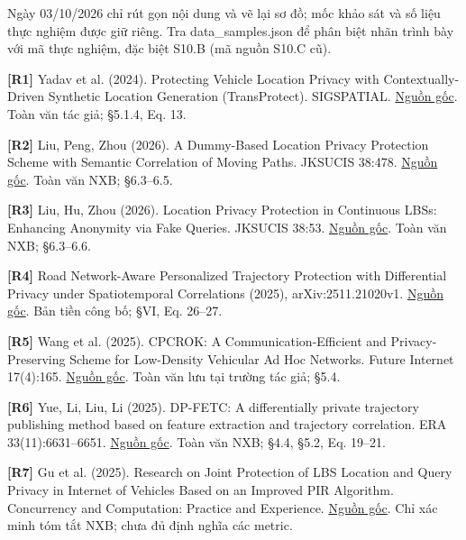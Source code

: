 \documentclass[10pt,a4paper]{article}
\begin{document}
Ngày 03/10/2026 chỉ rút gọn nội dung và vẽ lại sơ đồ; mốc khảo sát và số liệu thực nghiệm được giữ riêng. Tra data\_\allowbreak{}samples.json để phân biệt nhãn trình bày với mã thực nghiệm, đặc biệt S10.B (mã nguồn S10.C cũ).

\par\hypertarget{ref-R1}{}\textbf{[R1]} Yadav et al. (2024). Protecting Vehicle Location Privacy with Contextually-Driven Synthetic Location Generation (TransProtect). SIGSPATIAL. \href{https://arxiv.org/html/2409.09495v1}{Nguồn gốc}. Toàn văn tác giả; §5.1.4, Eq. 13.
\par\hypertarget{ref-R2}{}\textbf{[R2]} Liu, Peng, Zhou (2026). A Dummy-Based Location Privacy Protection Scheme with Semantic Correlation of Moving Paths. JKSUCIS 38:478. \href{https://link.springer.com/article/10.1007/s44443-026-00899-w}{Nguồn gốc}. Toàn văn NXB; §6.3–6.5.
\par\hypertarget{ref-R3}{}\textbf{[R3]} Liu, Hu, Zhou (2026). Location Privacy Protection in Continuous LBSs: Enhancing Anonymity via Fake Queries. JKSUCIS 38:53. \href{https://link.springer.com/article/10.1007/s44443-025-00438-z}{Nguồn gốc}. Toàn văn NXB; §6.3–6.6.
\par\hypertarget{ref-R4}{}\textbf{[R4]} Road Network-Aware Personalized Trajectory Protection with Differential Privacy under Spatiotemporal Correlations (2025), arXiv:2511.21020v1. \href{https://arxiv.org/html/2511.21020v1}{Nguồn gốc}. Bản tiền công bố; §VI, Eq. 26–27.
\par\hypertarget{ref-R5}{}\textbf{[R5]} Wang et al. (2025). CPCROK: A Communication-Efficient and Privacy-Preserving Scheme for Low-Density Vehicular Ad Hoc Networks. Future Internet 17(4):165. \href{https://uhra.herts.ac.uk/id/eprint/25705/1/futureinternet-17-00165.pdf}{Nguồn gốc}. Toàn văn lưu tại trường tác giả; §5.4.
\par\hypertarget{ref-R6}{}\textbf{[R6]} Yue, Li, Liu, Li (2025). DP-FETC: A differentially private trajectory publishing method based on feature extraction and trajectory correlation. ERA 33(11):6631–6651. \href{https://www.aimspress.com/aimspress-data/era/2025/11/PDF/era-33-11-293.pdf}{Nguồn gốc}. Toàn văn NXB; §4.4, §5.2, Eq. 19–21.
\par\hypertarget{ref-R7}{}\textbf{[R7]} Gu et al. (2025). Research on Joint Protection of LBS Location and Query Privacy in Internet of Vehicles Based on an Improved PIR Algorithm. Concurrency and Computation: Practice and Experience. \href{https://onlinelibrary.wiley.com/doi/abs/10.1002/cpe.70447}{Nguồn gốc}. Chỉ xác minh tóm tắt NXB; chưa đủ định nghĩa các metric.
\end{document}
